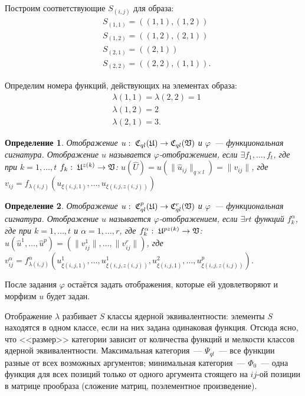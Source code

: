 \documentclass[a4paper, 12pt]{report}
\newtheorem{definition}{Определение}[chapter]
\begin{document}
Построим соответствующие $S_{(i,j)}$ для образа:
\begin{equation*}
\begin{split}
& S_{(1,1)} = ((1, 1), (1, 2)) \\
& S_{(1, 2)} = ((1, 2), (2, 1)) \\
& S_{(2, 1)} = ((2, 1)) \\
& S_{(2, 2)} = ((2, 2), (1, 1)).
\end{split}
\end{equation*}

Определим номера функций, действующих на элементах образа:
\begin{equation*}
\begin{split}
& \lambda(1, 1) = \lambda(2, 2) = 1 \\
& \lambda(1, 2) = 2 \\
& \lambda(2, 1) = 3.
\end{split}
\end{equation*}

\begin{definition}
Отображение $u: \; \mathfrak{C}_{ql}(\mathfrak{U}) \rightarrow \mathfrak{C}_{ql}(\mathfrak{V})$ и $\varphi$~--- функциональная сигнатура. Отображение $u$ называется $\varphi$-отображением, если $\exists f_1, \ldots, f_t$, где при $k = 1, \ldots, t$ $f_k: \; \mathfrak{U}^{z(k)} \rightarrow \mathfrak{V}$: $u(\hat{U}) = u(\| \hat{u}_{ij} \|_{q \times l}) = \| v_{ij} \|$, где $v_{ij} = f_{\lambda(i,j)}(u_{\xi(i,j,1)}, \ldots, u_{\xi(i,j,z(i, j))})$
\end{definition}

\begin{definition}
Отображение $u: \; \mathfrak{C}_{ql}^p(\mathfrak{U}) \rightarrow \mathfrak{C}_{ql}^r(\mathfrak{V})$ и $\varphi$~--- функциональная сигнатура. Отображение $u$ называется $\varphi$-отображением, если $\exists rt$ функций $f^{\alpha}_k$, где при $k = 1, \ldots, t$ и $\alpha = 1, \ldots, r$, где $f^{\alpha}_k: \; \mathfrak{U}^{pz(k)} \rightarrow \mathfrak{V}$: $u(\hat{u}^1, \ldots, \hat{u}^p) = (\| v^1_{ij}\|, \ldots, \| v^r_{ij} \|)$, где $v^{\alpha}_{ij} = f^{\alpha}_{\lambda(i,j)}(u^1_{\xi(i,j,1)}, \ldots, u^1_{\xi(i,j,z(i,j))}, u^2_{\xi(i,j,1)}, \ldots, u^p_{\xi(i,j,z(i, j))})$.
\end{definition}

После задания $\varphi$ остаётся задать отображения, которые ей удовлетворяют и морфизм $u$ будет задан.

Отображение $\lambda$ разбивает $S$ классы ядерной эквивалентности: элементы $S$ находятся в одном классе, если на них задана одинаковая функция. Отсюда ясно, что <<размер>> категории зависит от количества функций и мелкости классов ядерной эквивалентности. Максимальная категория~--- $\Psi_{ql}$~--- все функции разные от всех возможных аргументов; минимальная категория~--- $\Phi_0$~--- одна функция для всех позиций только от одного аргумента стоящего на $ij$-ой позиции в матрице прообраза (сложение матриц, поэлементное произведение).
\end{document}
